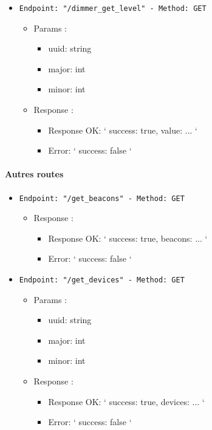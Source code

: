 \begin{itemize}
  \item \texttt{Endpoint: "/dimmer_get_level" -  Method: GET}
  \begin{itemize} 
    \item Params :
    \begin{itemize}
      \item uuid: string
      \item major: int
      \item minor: int
    \end{itemize}

    \item Response : 
    \begin{itemize}
      \item Response OK: `{ success: true, value: ... }`
      \item Error: `{ success: false }`
    \end{itemize}
  \end{itemize}
\end{itemize}

\paragraph{Autres routes}

\begin{itemize}
  \item \texttt{Endpoint: "/get_beacons" -  Method: GET}
  \begin{itemize}
    \item Response : 
    \begin{itemize}
      \item Response OK: `{ success: true, beacons: ... }`
      \item Error: `{ success: false }`
    \end{itemize}
  \end{itemize}
\end{itemize}

\begin{itemize}
  \item \texttt{Endpoint: "/get_devices" -  Method: GET}
  \begin{itemize} 
    \item Params :
    \begin{itemize}
      \item uuid: string
      \item major: int
      \item minor: int
    \end{itemize}

    \item Response : 
    \begin{itemize}
      \item Response OK: `{ success: true, devices: ... }`
      \item Error: `{ success: false }`
    \end{itemize}
  \end{itemize}
\end{itemize}

